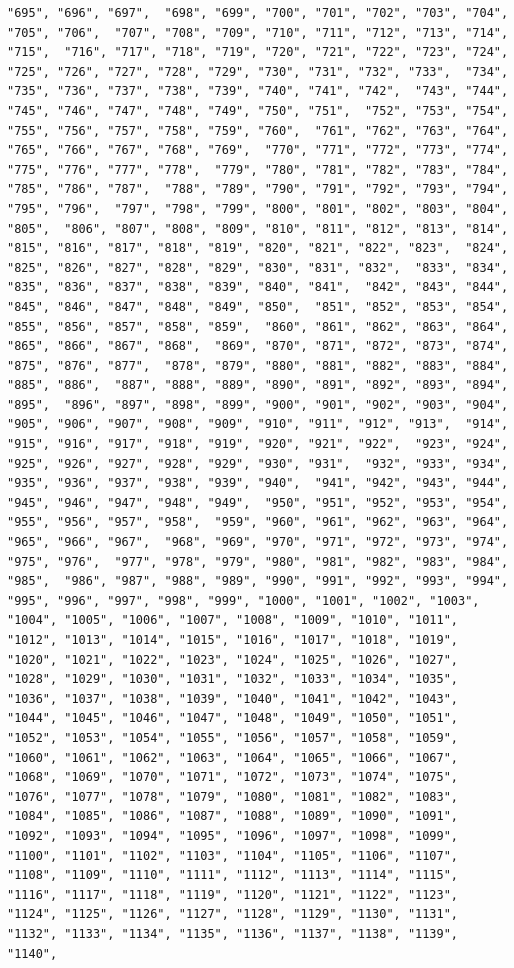 \documentclass[
]{article}
\begin{document}
\begin{verbatim}
"695", "696", "697",  "698", "699", "700", "701", "702", "703", "704", "705", "706",  "707", "708", "709", "710", "711", "712", "713", "714", "715",  "716", "717", "718", "719", "720", "721", "722", "723", "724",  "725", "726", "727", "728", "729", "730", "731", "732", "733",  "734", "735", "736", "737", "738", "739", "740", "741", "742",  "743", "744", "745", "746", "747", "748", "749", "750", "751",  "752", "753", "754", "755", "756", "757", "758", "759", "760",  "761", "762", "763", "764", "765", "766", "767", "768", "769",  "770", "771", "772", "773", "774", "775", "776", "777", "778",  "779", "780", "781", "782", "783", "784", "785", "786", "787",  "788", "789", "790", "791", "792", "793", "794", "795", "796",  "797", "798", "799", "800", "801", "802", "803", "804", "805",  "806", "807", "808", "809", "810", "811", "812", "813", "814",  "815", "816", "817", "818", "819", "820", "821", "822", "823",  "824", "825", "826", "827", "828", "829", "830", "831", "832",  "833", "834", "835", "836", "837", "838", "839", "840", "841",  "842", "843", "844", "845", "846", "847", "848", "849", "850",  "851", "852", "853", "854", "855", "856", "857", "858", "859",  "860", "861", "862", "863", "864", "865", "866", "867", "868",  "869", "870", "871", "872", "873", "874", "875", "876", "877",  "878", "879", "880", "881", "882", "883", "884", "885", "886",  "887", "888", "889", "890", "891", "892", "893", "894", "895",  "896", "897", "898", "899", "900", "901", "902", "903", "904",  "905", "906", "907", "908", "909", "910", "911", "912", "913",  "914", "915", "916", "917", "918", "919", "920", "921", "922",  "923", "924", "925", "926", "927", "928", "929", "930", "931",  "932", "933", "934", "935", "936", "937", "938", "939", "940",  "941", "942", "943", "944", "945", "946", "947", "948", "949",  "950", "951", "952", "953", "954", "955", "956", "957", "958",  "959", "960", "961", "962", "963", "964", "965", "966", "967",  "968", "969", "970", "971", "972", "973", "974", "975", "976",  "977", "978", "979", "980", "981", "982", "983", "984", "985",  "986", "987", "988", "989", "990", "991", "992", "993", "994",  "995", "996", "997", "998", "999", "1000", "1001", "1002", "1003",  "1004", "1005", "1006", "1007", "1008", "1009", "1010", "1011",  "1012", "1013", "1014", "1015", "1016", "1017", "1018", "1019",  "1020", "1021", "1022", "1023", "1024", "1025", "1026", "1027",  "1028", "1029", "1030", "1031", "1032", "1033", "1034", "1035",  "1036", "1037", "1038", "1039", "1040", "1041", "1042", "1043",  "1044", "1045", "1046", "1047", "1048", "1049", "1050", "1051",  "1052", "1053", "1054", "1055", "1056", "1057", "1058", "1059",  "1060", "1061", "1062", "1063", "1064", "1065", "1066", "1067",  "1068", "1069", "1070", "1071", "1072", "1073", "1074", "1075",  "1076", "1077", "1078", "1079", "1080", "1081", "1082", "1083",  "1084", "1085", "1086", "1087", "1088", "1089", "1090", "1091",  "1092", "1093", "1094", "1095", "1096", "1097", "1098", "1099",  "1100", "1101", "1102", "1103", "1104", "1105", "1106", "1107",  "1108", "1109", "1110", "1111", "1112", "1113", "1114", "1115",  "1116", "1117", "1118", "1119", "1120", "1121", "1122", "1123",  "1124", "1125", "1126", "1127", "1128", "1129", "1130", "1131",  "1132", "1133", "1134", "1135", "1136", "1137", "1138", "1139",  "1140", 
\end{verbatim}
\end{document}
